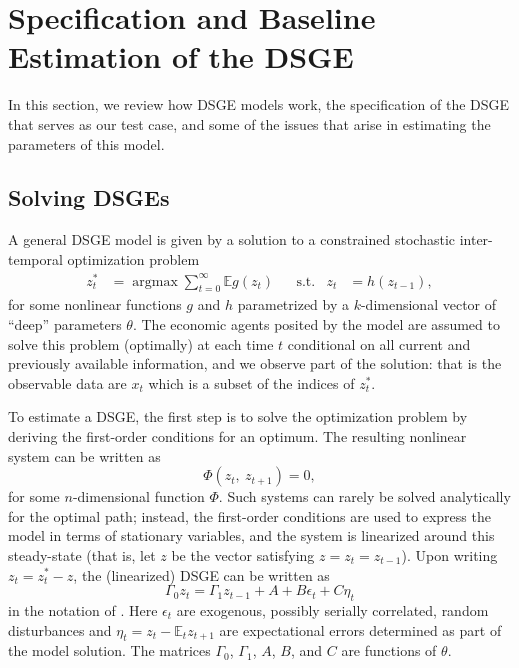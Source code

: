 \documentclass[11pt]{article}
\newcommand{\E}{\mathbb{E}}
\DeclareMathOperator*{\argmax}{argmax}
\begin{document}
\hypertarget{specification-and-baseline-estimation-of-the-dsge}{%
\section{Specification and Baseline Estimation of the
DSGE}\label{specification-and-baseline-estimation-of-the-dsge}}

In this section, we review how DSGE models work, the specification of
the \citet{SmetsWouters2007} DSGE that serves as our test case, and some
of the issues that arise in estimating the parameters of this model.

\hypertarget{sec:solveDSGEs}{%
\subsection{Solving DSGEs}\label{sec:solveDSGEs}}

A general DSGE model is given by a solution to a constrained stochastic
inter-temporal optimization problem \begin{align}
  z_t^* &=\argmax \sum_{t=0}^\infty \E g(z_t) &&\mbox{s.t.}&z_t&=h(z_{t-1}),
\end{align} for some nonlinear functions \(g\) and \(h\) parametrized by
a \(k\)-dimensional vector of ``deep'' parameters \(\theta\). The
economic agents posited by the model are assumed to solve this problem
(optimally) at each time \(t\) conditional on all current and previously
available information, and we observe part of the solution: that is the
observable data are \(x_t\) which is a subset of the indices of
\(z_t^*\).

To estimate a DSGE, the first step is to solve the optimization problem
by deriving the first-order conditions for an optimum. The resulting
nonlinear system can be written as \begin{equation}
  \Phi(z_t,\ z_{t+1})=0,
\end{equation} for some \(n\)-dimensional function \(\Phi\). Such
systems can rarely be solved analytically for the optimal path; instead,
the first-order conditions are used to express the model in terms of
stationary variables, and the system is linearized around this
steady-state (that is, let \(z\) be the vector satisfying
\(z=z_t=z_{t-1}\)). Upon writing \(z_t = z^*_t - z\), the (linearized)
DSGE can be written as \begin{equation}
  \Gamma_0 z_t = \Gamma_1 z_{t-1} + A + B \epsilon_t + C \eta_t
  \label{eq:lin-dsge}
\end{equation} in the notation of \citep{Sims2002}. Here \(\epsilon_t\)
are exogenous, possibly serially correlated, random disturbances and
\(\eta_t=z_t - \E_t z_{t+1}\) are expectational errors determined as
part of the model solution. The matrices \(\Gamma_0\), \(\Gamma_1\),
\(A\), \(B\), and \(C\) are functions of \(\theta\).
\end{document}

